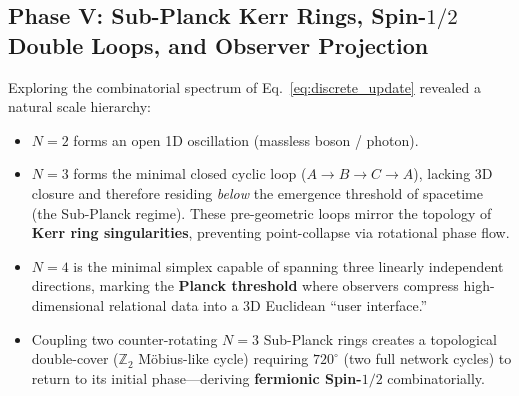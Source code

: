 \documentclass[11pt,a4paper]{article}
\theoremstyle{plain}
\theoremstyle{definition}
\theoremstyle{remark}
\begin{document}
\subsection{Phase V: Sub-Planck Kerr Rings, Spin-$1/2$ Double Loops, and Observer Projection}
Exploring the combinatorial spectrum of Eq.~\eqref{eq:discrete_update} revealed a natural scale hierarchy:
\begin{itemize}
\item $N=2$ forms an open 1D oscillation (massless boson / photon).
\item $N=3$ forms the minimal closed cyclic loop ($A \to B \to C \to A$), lacking 3D closure and therefore residing \textit{below} the emergence threshold of spacetime (the Sub-Planck regime). These pre-geometric loops mirror the topology of \textbf{Kerr ring singularities}, preventing point-collapse via rotational phase flow.
\item $N=4$ is the minimal simplex capable of spanning three linearly independent directions, marking the \textbf{Planck threshold} where observers compress high-dimensional relational data into a 3D Euclidean ``user interface.''
\item Coupling two counter-rotating $N=3$ Sub-Planck rings creates a topological double-cover ($\mathbb{Z}_2$ Möbius-like cycle) requiring $720^\circ$ (two full network cycles) to return to its initial phase---deriving \textbf{fermionic Spin-$1/2$} combinatorially.
\end{itemize}
\end{document}
